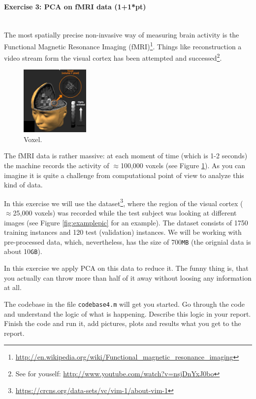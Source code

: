 \documentclass[a4paper,11pt]{article}
\newenvironment{exercise}[3]{\paragraph{Exercise #1: #2 (#3pt)}\ \\}{
\medskip}
\begin{document}
%
%
\begin{exercise}{3}{PCA on fMRI data}{1+1*}
The most spatially precise non-invasive way of measuring brain activity is the Functional Magnetic Resonance Imaging (fMRI)\footnote{\url{http://en.wikipedia.org/wiki/Functional_magnetic_resonance_imaging}}. Things like reconstruction a video stream form the visual cortex has been attempted and successed\footnote{See for youself: \url{http://www.youtube.com/watch?v=nsjDnYxJ0bo}}.

\begin{figure}
	\centering
	\vspace{-12pt}
	\includegraphics[width=0.3\textwidth]{voxel.jpg}
	\caption{Voxel.}
	\label{fig:voxel}
	\vspace{-10pt}
\end{figure}
The fMRI data is rather massive: at each moment of time (which is 1-2 seconds) the machine records the activity of $\approx$100,000 voxels (see Figure \ref{fig:voxel}). As you can imagine it is quite a challenge from computational point of view to analyze this kind of data.

In this exercise we will use the dataset\footnote{\url{https://crcns.org/data-sets/vc/vim-1/about-vim-1}}, where the region of the visual cortex ($\approx$25,000 voxels) was recorded while the test subject was looking at different images (see Figure \ref{fig:examplepic} for an example). The dataset consists of 1750 training instances and 120 test (validation) instances. We will be working with pre-processed data, which, nevertheless, has the size of 700\texttt{MB} (the orignial data is about 10\texttt{GB}).

In this exercise we apply PCA on this data to reduce it. The funny thing is, that you actually can throw more than half of it away without loosing any information at all. 

The codebase in the file \texttt{codebase4.m} will get you started. Go through the code and understand the logic of what is happening. Describe this logic in your report. Finish the code and run it, add pictures, plots and results what you get to the report.


\end{exercise}
\end{document}
